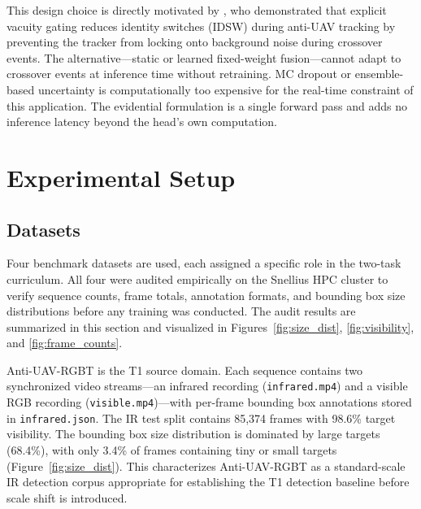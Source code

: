 \documentclass[nolinenumbering]{thesisdesign}
\begin{document}
This design choice is directly motivated by \citet{zhu_evidential_2023}, who demonstrated that explicit vacuity gating reduces identity switches (IDSW) during anti-UAV tracking by preventing the tracker from locking onto background noise during crossover events. The alternative---static or learned fixed-weight fusion---cannot adapt to crossover events at inference time without retraining. MC dropout or ensemble-based uncertainty is computationally too expensive for the real-time constraint of this application. The evidential formulation is a single forward pass and adds no inference latency beyond the head's own computation.


\section{Experimental Setup}
\label{sec:experimental_setup}


\subsection{Datasets}
\label{sec:datasets}

Four benchmark datasets are used, each assigned a specific role in the two-task curriculum. All four were audited empirically on the Snellius HPC cluster to verify sequence counts, frame totals, annotation formats, and bounding box size distributions before any training was conducted. The audit results are summarized in this section and visualized in Figures~\ref{fig:size_dist}, \ref{fig:visibility}, and \ref{fig:frame_counts}.

Anti-UAV-RGBT \citep{jiang_anti-uav_2023} is the T1 source domain. Each sequence contains two synchronized video streams---an infrared recording (\texttt{infrared.mp4}) and a visible RGB recording (\texttt{visible.mp4})---with per-frame bounding box annotations stored in \texttt{infrared.json}. The IR test split contains 85,374 frames with 98.6\% target visibility. The bounding box size distribution is dominated by large targets (68.4\%), with only 3.4\% of frames containing tiny or small targets (Figure~\ref{fig:size_dist}). This characterizes Anti-UAV-RGBT as a standard-scale IR detection corpus appropriate for establishing the T1 detection baseline before scale shift is introduced.
\end{document}
